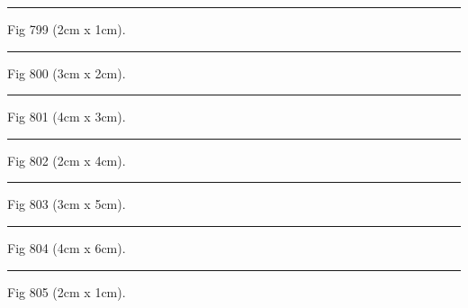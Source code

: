 \documentclass[a4paper,11pt]{article}
\begin{document}
\begin{swarmwrap}%
  \begin{minipage}[t]{2cm}
    \centering
    \rule{\linewidth}{1cm}
    {\footnotesize Fig 799 (2cm x 1cm).}
  \end{minipage}%
\end{swarmwrap}%
\swarmwrapnext
\lipsum[49]%

\begin{swarmwrap}%
  \begin{minipage}[t]{3cm}
    \centering
    \rule{\linewidth}{2cm}
    {\footnotesize Fig 800 (3cm x 2cm).}
  \end{minipage}%
\end{swarmwrap}%
\swarmwrapnext
\lipsum[50]%

\begin{swarmwrap}%
  \begin{minipage}[t]{4cm}
    \centering
    \rule{\linewidth}{3cm}
    {\footnotesize Fig 801 (4cm x 3cm).}
  \end{minipage}%
\end{swarmwrap}%
\swarmwrapnext
\lipsum[51]%

\begin{swarmwrap}%
  \begin{minipage}[t]{2cm}
    \centering
    \rule{\linewidth}{4cm}
    {\footnotesize Fig 802 (2cm x 4cm).}
  \end{minipage}%
\end{swarmwrap}%
\swarmwrapnext
\lipsum[52]%

\begin{swarmwrap}%
  \begin{minipage}[t]{3cm}
    \centering
    \rule{\linewidth}{5cm}
    {\footnotesize Fig 803 (3cm x 5cm).}
  \end{minipage}%
\end{swarmwrap}%
\swarmwrapnext
\lipsum[53]%

\begin{swarmwrap}%
  \begin{minipage}[t]{4cm}
    \centering
    \rule{\linewidth}{6cm}
    {\footnotesize Fig 804 (4cm x 6cm).}
  \end{minipage}%
\end{swarmwrap}%
\swarmwrapnext
\lipsum[54]%

\begin{swarmwrap}%
  \begin{minipage}[t]{2cm}
    \centering
    \rule{\linewidth}{1cm}
    {\footnotesize Fig 805 (2cm x 1cm).}
  \end{minipage}%
\end{swarmwrap}%
\swarmwrapnext
\lipsum[55]%
\end{document}
